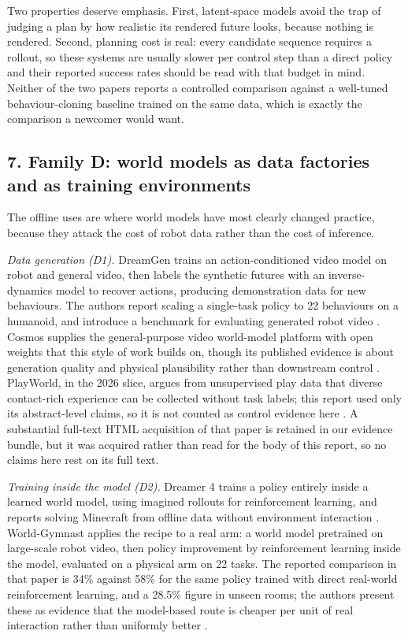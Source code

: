 \documentclass[
  10pt,
  english,
]{article}
\begin{document}
Two properties deserve emphasis. First, latent-space models avoid the
trap of judging a plan by how realistic its rendered future looks,
because nothing is rendered. Second, planning cost is real: every
candidate sequence requires a rollout, so these systems are usually
slower per control step than a direct policy and their reported success
rates should be read with that budget in mind. Neither of the two papers
reports a controlled comparison against a well-tuned behaviour-cloning
baseline trained on the same data, which is exactly the comparison a
newcomer would want.

\hypertarget{family-d-world-models-as-data-factories-and-as-training-environments}{%
\subsection{7. Family D: world models as data factories and as training
environments}\label{family-d-world-models-as-data-factories-and-as-training-environments}}

The offline uses are where world models have most clearly changed
practice, because they attack the cost of robot data rather than the
cost of inference.

\emph{Data generation (D1).} DreamGen trains an action-conditioned video
model on robot and general video, then labels the synthetic futures with
an inverse-dynamics model to recover actions, producing demonstration
data for new behaviours. The authors report scaling a single-task policy
to 22 behaviours on a humanoid, and introduce a benchmark for evaluating
generated robot video \citep{dreamgen}. Cosmos supplies the
general-purpose video world-model platform with open weights that this
style of work builds on, though its published evidence is about
generation quality and physical plausibility rather than downstream
control \citep{cosmos}. PlayWorld, in the 2026 slice, argues from
unsupervised play data that diverse contact-rich experience can be
collected without task labels; this report used only its abstract-level
claims, so it is not counted as control evidence here \citep{playworld}.
A substantial full-text HTML acquisition of that paper is retained in
our evidence bundle, but it was acquired rather than read for the body
of this report, so no claims here rest on its full text.

\emph{Training inside the model (D2).} Dreamer 4 trains a policy
entirely inside a learned world model, using imagined rollouts for
reinforcement learning, and reports solving Minecraft from offline data
without environment interaction \citep{dreamer4}. World-Gymnast applies
the recipe to a real arm: a world model pretrained on large-scale robot
video, then policy improvement by reinforcement learning inside the
model, evaluated on a physical arm on 22 tasks. The reported comparison
in that paper is 34\% against 58\% for the same policy trained with
direct real-world reinforcement learning, and a 28.5\% figure in unseen
rooms; the authors present these as evidence that the model-based route
is cheaper per unit of real interaction rather than uniformly better
\citep{world_gymnast}.
\end{document}
